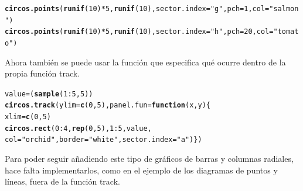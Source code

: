 \documentclass{article}\usepackage[]{graphicx}\usepackage[]{color}
\makeatletter
\newcommand{\hlnum}[1]{\textcolor[rgb]{0.686,0.059,0.569}{#1}}%
\newcommand{\hlstr}[1]{\textcolor[rgb]{0.192,0.494,0.8}{#1}}%
\newcommand{\hlopt}[1]{\textcolor[rgb]{0,0,0}{#1}}%
\newcommand{\hlstd}[1]{\textcolor[rgb]{0.345,0.345,0.345}{#1}}%
\newcommand{\hlkwa}[1]{\textcolor[rgb]{0.161,0.373,0.58}{\textbf{#1}}}%
\newcommand{\hlkwb}[1]{\textcolor[rgb]{0.69,0.353,0.396}{#1}}%
\newcommand{\hlkwc}[1]{\textcolor[rgb]{0.333,0.667,0.333}{#1}}%
\newcommand{\hlkwd}[1]{\textcolor[rgb]{0.737,0.353,0.396}{\textbf{#1}}}%
\newenvironment{kframe}{%
 \def\at@end@of@kframe{}%
 \ifinner\ifhmode%
  \def\at@end@of@kframe{\end{minipage}}%
  \begin{minipage}{\columnwidth}%
 \fi\fi%
 \def\FrameCommand##1{\hskip\@totalleftmargin \hskip-\fboxsep
 \colorbox{shadecolor}{##1}\hskip-\fboxsep
     \hskip-\linewidth \hskip-\@totalleftmargin \hskip\columnwidth}%
 \MakeFramed {\advance\hsize-\width
   \@totalleftmargin\z@ \linewidth\hsize
   \@setminipage}}%
 {\par\unskip\endMakeFramed%
 \at@end@of@kframe}
\newenvironment{knitrout}{}{} %
\makeatother
\begin{document}
\begin{knitrout}
\begin{kframe}
\begin{alltt}
    \hlkwd{circos.points}\hlstd{(}\hlkwd{runif}\hlstd{(}\hlnum{10}\hlstd{)}\hlopt{*}\hlnum{5}\hlstd{,} \hlkwd{runif}\hlstd{(}\hlnum{10}\hlstd{),} \hlkwc{sector.index} \hlstd{=} \hlstr{"g"}\hlstd{,} \hlkwc{pch} \hlstd{=} \hlnum{1}\hlstd{,} \hlkwc{col} \hlstd{=} \hlstr{"salmon"}\hlstd{)}
    \hlkwd{circos.points}\hlstd{(}\hlkwd{runif}\hlstd{(}\hlnum{10}\hlstd{)}\hlopt{*}\hlnum{5}\hlstd{,} \hlkwd{runif}\hlstd{(}\hlnum{10}\hlstd{),} \hlkwc{sector.index} \hlstd{=} \hlstr{"h"}\hlstd{,} \hlkwc{pch} \hlstd{=} \hlnum{20}\hlstd{,} \hlkwc{col} \hlstd{=} \hlstr{"tomato"}\hlstd{)}
\end{alltt}
\end{kframe}
\end{knitrout}
\clearpage
Ahora tambi\'en se puede usar la funci\'on que especifica qu\'e ocurre dentro de la propia funci\'on track.
\begin{knitrout}
\color{fgcolor}\begin{kframe}
\begin{alltt}
\hlstd{value} \hlkwb{=} \hlstd{(}\hlkwd{sample}\hlstd{(}\hlnum{1}\hlopt{:}\hlnum{5}\hlstd{,} \hlnum{5}\hlstd{))}
\hlkwd{circos.track}\hlstd{(}\hlkwc{ylim} \hlstd{=} \hlkwd{c}\hlstd{(}\hlnum{0}\hlstd{,} \hlnum{5}\hlstd{),} \hlkwc{panel.fun} \hlstd{=} \hlkwa{function}\hlstd{(}\hlkwc{x}\hlstd{,} \hlkwc{y}\hlstd{) \{}
   \hlstd{xlim} \hlkwb{=} \hlkwd{c}\hlstd{(}\hlnum{0}\hlstd{,}\hlnum{5}\hlstd{)}
   \hlkwd{circos.rect}\hlstd{(} \hlnum{0}\hlopt{:}\hlnum{4}\hlstd{,}\hlkwd{rep}\hlstd{(}\hlnum{0}\hlstd{,} \hlnum{5}\hlstd{),} \hlnum{1}\hlopt{:}\hlnum{5}\hlstd{, value,}
                            \hlkwc{col} \hlstd{=} \hlstr{"orchid"}\hlstd{,} \hlkwc{border} \hlstd{=} \hlstr{"white"}\hlstd{,} \hlkwc{sector.index} \hlstd{=} \hlstr{"a"}\hlstd{)\})}
\end{alltt}
\end{kframe}
\end{knitrout}
Para poder seguir a\~nadiendo este tipo de gr\'aficos de barras y columnas radiales, hace falta implementarlos, como en el ejemplo de los diagramas de puntos y l\'ineas, fuera de la funci\'on track.
\end{document}
